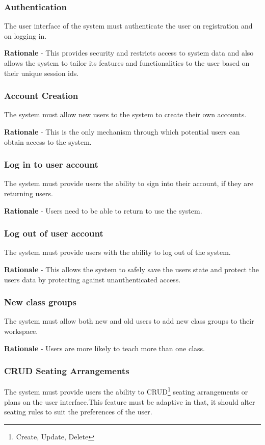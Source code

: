 \subsubsection{Authentication}
The user interface of the system must authenticate the user on registration and on logging in.

\textbf{Rationale} - This provides security and restricts access to system data and also allows the system to tailor its features and functionalities to the user based on their unique session ids.

\subsubsection{Account Creation}
The system must allow new users to the system to create their own accounts.

\textbf{Rationale} - This is the only mechanism through which potential users can obtain access to the system.

\subsubsection{Log in to user account}
The system must provide users the ability to sign into their account, if they are returning users.

\textbf{Rationale} - Users need to be able to return to use the system.

\subsubsection{Log out of user account}
The system must provide users with the ability to log out of the system.

\textbf{Rationale} - This allows the system to safely save the users state and protect the users data by protecting against unauthenticated access.

\subsubsection{New class groups}
The system must allow both new and old users to add new class groups to their workspace.

\textbf{Rationale} - Users are more likely to teach more than one class.

\subsubsection{CRUD Seating Arrangements}
The system must provide users the ability to CRUD\footnote{Create, Update, Delete} seating arrangements or plans on the user interface.This feature must be adaptive in that, it should alter seating rules to suit the preferences of the user.

